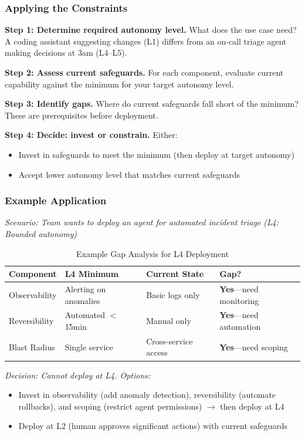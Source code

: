 \subsubsection{Applying the Constraints}

\textbf{Step 1: Determine required autonomy level.}
What does the use case need? A coding assistant suggesting changes (L1) differs from an on-call triage agent making decisions at 3am (L4--L5).

\textbf{Step 2: Assess current safeguards.}
For each component, evaluate current capability against the minimum for your target autonomy level.

\textbf{Step 3: Identify gaps.}
Where do current safeguards fall short of the minimum? These are prerequisites before deployment.

\textbf{Step 4: Decide: invest or constrain.}
Either:
\begin{itemize}
    \item Invest in safeguards to meet the minimum (then deploy at target autonomy)
    \item Accept lower autonomy level that matches current safeguards
\end{itemize}

\subsubsection{Example Application}

\textit{Scenario: Team wants to deploy an agent for automated incident triage (L4: Bounded autonomy)}

\begin{table}[htbp]
\centering
\caption{Example Gap Analysis for L4 Deployment}
\label{tab:gap-analysis-example}
\begin{tabular}{llll}
\toprule
\textbf{Component} & \textbf{L4 Minimum} & \textbf{Current State} & \textbf{Gap?} \\
\midrule
Observability & Alerting on anomalies & Basic logs only & \textbf{Yes}---need monitoring \\
Reversibility & Automated $<$15min & Manual only & \textbf{Yes}---need automation \\
Blast Radius & Single service & Cross-service access & \textbf{Yes}---need scoping \\
\bottomrule
\end{tabular}
\end{table}

\textit{Decision: Cannot deploy at L4. Options:}
\begin{itemize}
    \item Invest in observability (add anomaly detection), reversibility (automate rollbacks), and scoping (restrict agent permissions) $\rightarrow$ then deploy at L4
    \item Deploy at L2 (human approves significant actions) with current safeguards
\end{itemize}

